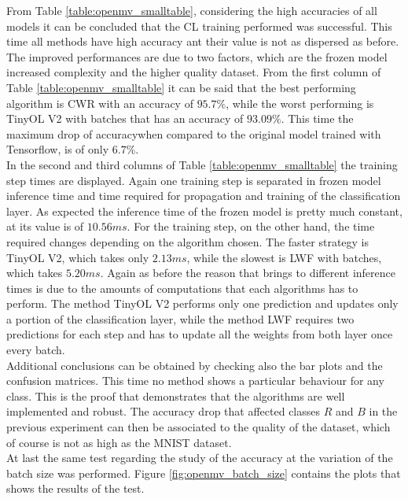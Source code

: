 \documentclass[12pt]{report}
\begin{document}
From Table \ref{table:openmv_smalltable}, considering the high accuracies of all models it can be concluded that the CL training performed was successful. This time all methods have high accuracy ant their value is not as dispersed as before. The improved performances are due to two factors, which are the frozen model increased complexity and the higher quality dataset. From the first column of Table \ref{table:openmv_smalltable} it can be said that the best performing algorithm is CWR with an accuracy of   $95.7 \%$, while the worst performing is TinyOL V2 with batches that has an accuracy of $93.09 \%$. This time the maximum drop of accuracywhen compared to the original model trained with Tensorflow, is of only $6.7 \%$.\\
In the second and third columns of Table \ref{table:openmv_smalltable} the training step times are displayed. Again one training step is separated in frozen model inference time and time required for propagation and training of the classification layer. As expected the inference time of the frozen model is pretty much constant, at its value is of $10.56 ms$. For the training step, on the other hand, the time required changes depending on the algorithm chosen. The faster strategy is TinyOL V2, which takes only $2.13 ms$, while the slowest is LWF with batches, which takes $5.20 ms$. Again as before the reason that brings to different inference times is due to the amounts of computations that each algorithms has to perform.  The method TinyOL V2 performs only one prediction and updates only a portion of the classification layer, while the method LWF requires two predictions for each step and has to update all the weights from both layer once every batch.\\
Additional conclusions can be obtained by checking also the bar plots and the confusion matrices. This time no method shows a particular behaviour for any class. This is the proof that demonstrates that the algorithms are well implemented and robust. The accuracy drop that affected classes $R$ and $B$ in the previous experiment can then be associated to the quality of the dataset, which of course is not as high as the MNIST dataset.\\
At last the same test regarding the study of the accuracy at the variation of the batch size was performed. Figure \ref{fig:openmv_batch_size} contains the plots that shows the results of the test.
\end{document}
